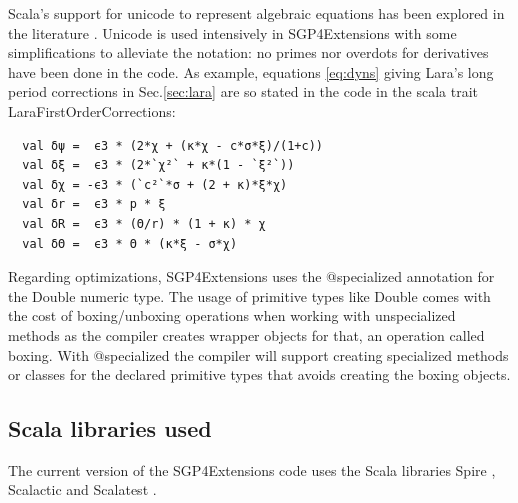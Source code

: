 \documentclass{article}
\begin{document}
Scala's support for unicode to represent algebraic equations has been explored in the literature \cite{DBLP:journals/corr/abs-1112-1751}. Unicode is used intensively in SGP4Extensions with some simplifications to alleviate the notation: no primes nor overdots for derivatives have been done in the code.
As example, equations \ref{eq:dyns} giving Lara's long period corrections in Sec.\ref{sec:lara} are so stated in the code in the scala trait LaraFirstOrderCorrections:
%
%
\begin{verbatim}
  val δψ =  ϵ3 * (2*χ + (κ*χ - c*σ*ξ)/(1+c))
  val δξ =  ϵ3 * (2*`χ²` + κ*(1 - `ξ²`))
  val δχ = -ϵ3 * (`c²`*σ + (2 + κ)*ξ*χ)
  val δr =  ϵ3 * p * ξ
  val δR =  ϵ3 * (Θ/r) * (1 + κ) * χ
  val δΘ =  ϵ3 * Θ * (κ*ξ - σ*χ)
\end{verbatim}

Regarding optimizations, SGP4Extensions uses the @specialized annotation for the Double numeric type. The usage of primitive types like Double comes with the cost of boxing/unboxing operations when working with unspecialized methods as the compiler creates wrapper objects for that, an operation called boxing. With @specialized the compiler will support creating specialized methods or classes for the declared primitive types that avoids creating the boxing objects.


\subsection{Scala libraries used}
\label{sec:libraries}

The current version of the SGP4Extensions code uses the Scala libraries Spire \cite{Spire2011}, Scalactic \cite{Scalactic2015} and Scalatest \cite{Scalatest2009}.
\end{document}
